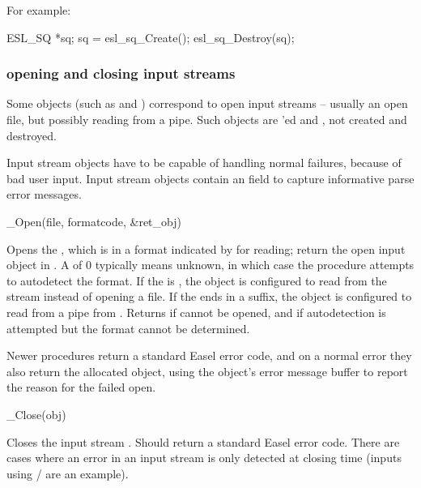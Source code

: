 For example:
\begin{cchunk}
   ESL_SQ *sq;
   sq = esl_sq_Create();
   esl_sq_Destroy(sq);
\end{cchunk}

  \subsubsection{opening and closing input streams}

Some objects (such as  and )
correspond to open input streams -- usually an open file, but possibly
reading from a pipe. Such objects are 'ed and
, not created and destroyed.

Input stream objects have to be capable of handling normal failures,
because of bad user input. Input stream objects contain an
 field to capture informative parse error
messages. 

\begin{sreapi}
\hypertarget{ifc:Open} 
{\item[\_Open(file, formatcode, \&ret\_obj)]}

Opens the , which is in a format indicated by
 for reading; return the open input object in
. A  of 0 typically means unknown,
in which case the  procedure attempts to autodetect
the format. If the  is , the object is
configured to read from the  stream instead of opening a
file. If the  ends in a  suffix, the object is
configured to read from a pipe from . Returns
 if  cannot be opened, and
 if autodetection is attempted but the format cannot
be determined. 

Newer  procedures return a standard Easel error code,
and on a normal error they also return the allocated object, using the
object's error message buffer to report the reason for the failed
open.

\hypertarget{ifc:Close} 
{\item[\_Close(obj)]}

Closes the input stream . Should return a standard Easel
error code. There are cases where an error in an input stream is only
detected at closing time (inputs using /
  are an example).
\end{sreapi}

